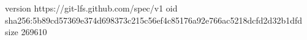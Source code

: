 version https://git-lfs.github.com/spec/v1
oid sha256:5b89cd57369e374d698373c215c56ef4c85176a92e766ac5218dcfd2d32b1dfd
size 269610
